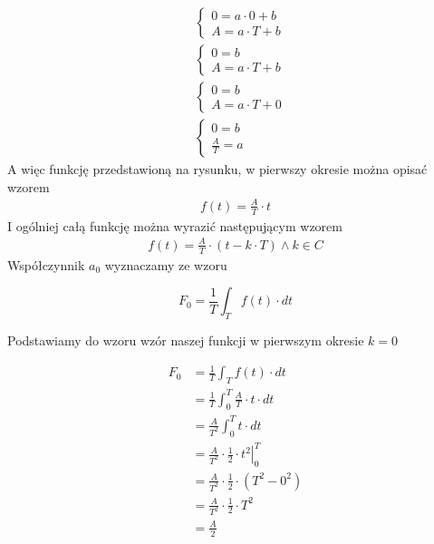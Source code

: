 \begin{align*}
&\left\{\begin{matrix}
0 = a\cdot 0 +b\\ 
A = a\cdot T +b
\end{matrix}\right. \\
&\left\{\begin{matrix}
0 = b\\ 
A = a\cdot T +b
\end{matrix}\right. \\
&\left\{\begin{matrix}
0 = b\\ 
A = a\cdot T +0
\end{matrix}\right. \\
&\left\{\begin{matrix}
0 = b\\ 
\frac{A}{T} = a
\end{matrix}\right.
\end{align*}
A więc funkcję przedstawioną na rysunku, w pierwszy okresie można opisać wzorem
\begin{align*}
f(t) = \frac{A}{T}\cdot t
\end{align*}
I ogólniej całą funkcję można wyrazić następującym wzorem
\begin{align*}
f(t) = \frac{A}{T}\cdot \left(t-k\cdot T\right) \wedge k \in C
\end{align*}
Współczynnik $a_0$ wyznaczamy ze wzoru

\begin{equation}
F_0=\frac{1}{T}\int_{T}f(t) \cdot dt
\end{equation}

Podstawiamy do wzoru wzór naszej funkcji w pierwszym okresie $k=0$

\begin{align*}
F_0&=\frac{1}{T}\int_{T}f(t) \cdot dt\\
&=\frac{1}{T}\int_{0}^{T} \frac{A}{T}\cdot t \cdot dt\\
&=\frac{A}{T^2}\int_{0}^{T} t \cdot dt\\
&=\frac{A}{T^2}\cdot \left. \frac{1}{2}\cdot t^2 \right|_{0}^{T}\\
&=\frac{A}{T^2}\cdot \frac{1}{2}\cdot \left( T^2 -0^2 \right)\\
&=\frac{A}{T^2}\cdot \frac{1}{2}\cdot T^2\\
&=\frac{A}{2}\\
\end{align*}

